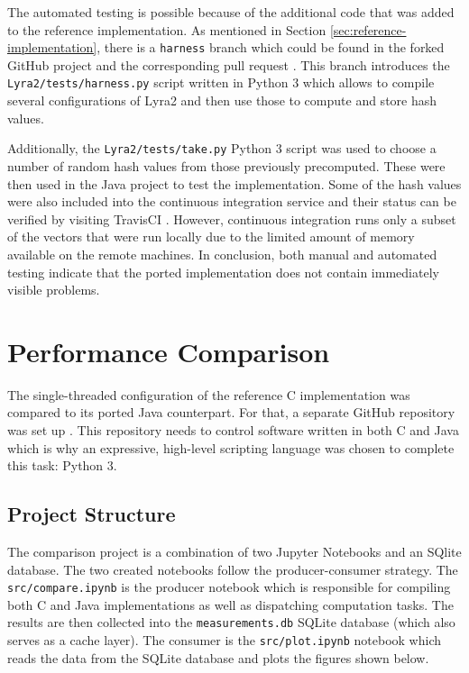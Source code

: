 The automated testing is possible because of the additional code that was added to the reference implementation. As mentioned in Section \ref{sec:reference-implementation}, there is a \verb|harness| branch which could be found in the forked GitHub project \cite{github:2017:lyra-copy} and the corresponding pull request \cite{github:2017:lyra-pr}. This branch introduces the \verb|Lyra2/tests/harness.py| script written in Python 3 which allows to compile several configurations of Lyra2 and then use those to compute and store hash values.

Additionally, the \verb|Lyra2/tests/take.py| Python 3 script was used to choose a number of random hash values from those previously precomputed. These were then used in the Java project to test the implementation. Some of the hash values were also included into the continuous integration service and their status can be verified by visiting TravisCI \cite{travis:2017:lyra}. However, continuous integration runs only a subset of the vectors that were run locally due to the limited amount of memory available on the remote machines. In conclusion, both manual and automated testing indicate that the ported implementation does not contain immediately visible problems.

\section{Performance Comparison}
\label{sec:performance-comparison}

The single-threaded configuration of the reference C implementation was compared to its ported Java counterpart. For that, a separate GitHub repository was set up \cite{github:2017:lyra2-compare}. This repository needs to control software written in both C and Java which is why an expressive, high-level scripting language was chosen to complete this task: Python 3.

\subsection{Project Structure}

The comparison project \cite{github:2017:lyra2-compare} is a combination of two Jupyter Notebooks \cite{jupyter:2017:jupyter} and an SQlite database. The two created notebooks follow the producer-consumer strategy. The \texttt{src/compare.ipynb} is the producer notebook which is responsible for compiling both C and Java implementations as well as dispatching computation tasks. The results are then collected into the \texttt{measurements.db} SQLite database (which also serves as a cache layer). The consumer is the \texttt{src/plot.ipynb} notebook which reads the data from the SQLite database and plots the figures shown below.

